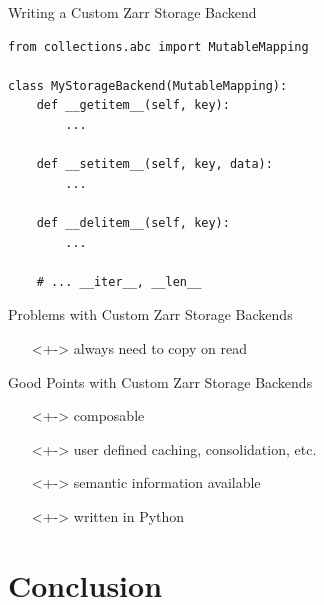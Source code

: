 \documentclass{beamer}
\begin{document}
\begin{frame}[fragile]{Writing a Custom Zarr Storage Backend}
  \begin{verbatim}
from collections.abc import MutableMapping

class MyStorageBackend(MutableMapping):
    def __getitem__(self, key):
        ...

    def __setitem__(self, key, data):
        ...

    def __delitem__(self, key):
        ...

    # ... __iter__, __len__
  \end{verbatim}
\end{frame}

\begin{frame}{Problems with Custom Zarr Storage Backends}
  \begin{itemize}
  \item[]<+-> always need to copy on read
  \end{itemize}
\end{frame}

\begin{frame}{Good Points with Custom Zarr Storage Backends}
  \begin{itemize}
  \item[]<+-> composable
  \item[]<+-> user defined caching, consolidation, etc.
  \item[]<+-> semantic information available
  \item[]<+-> written in Python
  \end{itemize}
\end{frame}

\section{Conclusion}
\end{document}
